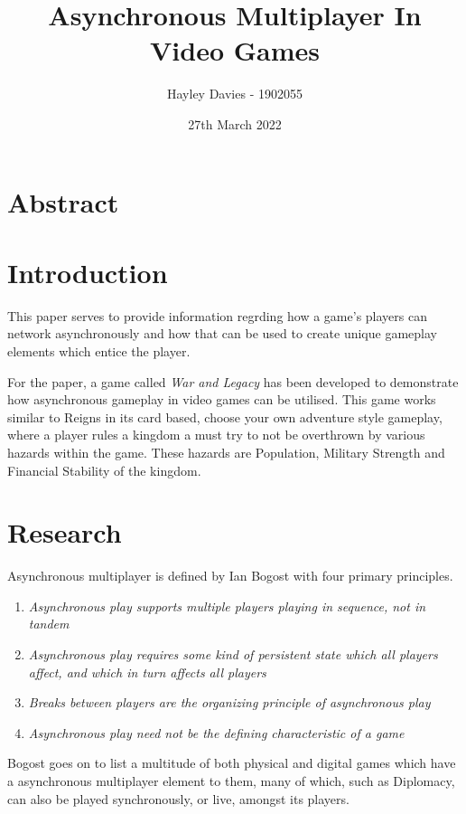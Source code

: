 \documentclass{article}
\title{Asynchronous Multiplayer In Video Games}
\author{Hayley Davies - 1902055}
\date{27th March 2022}
\begin{document}
\maketitle

\section{Abstract}


\section{Introduction}
This paper serves to provide information regrding how a game's players can network asynchronously and how that can be used to create unique gameplay elements which entice the player.

For the paper, a game called \emph{War and Legacy} has been developed to demonstrate how asynchronous gameplay in video games can be utilised. This game works similar to Reigns\cite{reigns2016} in its card based, choose your own adventure style gameplay, where a player rules a kingdom a must try to not be overthrown by various hazards within the game. These hazards are Population, Military Strength and Financial Stability of the kingdom.

\section{Research}
Asynchronous multiplayer is defined by Ian Bogost\cite{bogost2004} with four primary principles.
\begin{enumerate}
    \item \emph{Asynchronous play supports multiple players playing in sequence, not in tandem}
    \item \emph{Asynchronous play requires some kind of persistent state which all players affect, and which in turn affects all players}
    \item \emph{Breaks between players are the organizing principle of asynchronous play}
    \item \emph{Asynchronous play need not be the defining characteristic of a game}
\end{enumerate}

Bogost goes on to list a multitude of both physical and digital games which have a asynchronous multiplayer element to them, many of which, such as Diplomacy\cite{diplomacy1959}, can also be played synchronously, or live, amongst its players.
\end{document}

